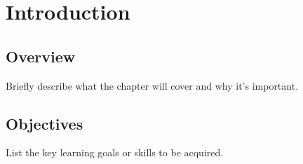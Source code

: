 \section{Introduction}
\subsection*{Overview}
Briefly describe what the chapter will cover and why it's important.
\subsection*{Objectives}
List the key learning goals or skills to be acquired.